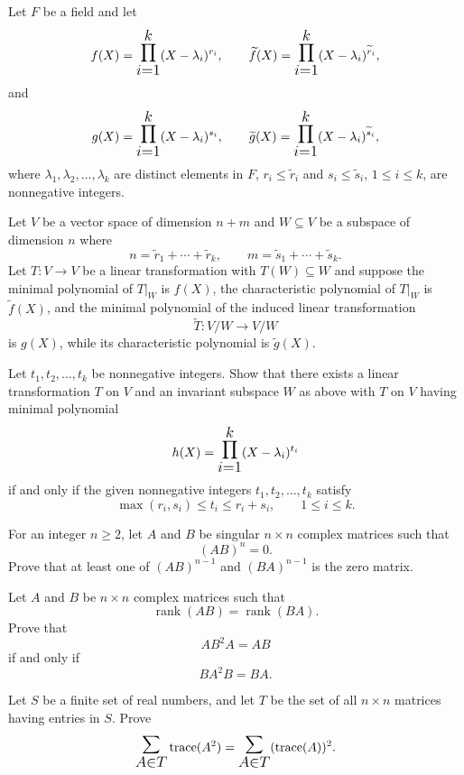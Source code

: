 \documentclass[12pt]{article}
\let\oldsum\sum
\let\oldprod\prod
\renewcommand{\sum}{\mathlarger{\mathlarger{\oldsum}}}
\renewcommand{\prod}{\mathlarger{\mathlarger{\oldprod}}}
\begin{document}
\begin{problem}
Let $F$ be a field and let
\[
f(X)=\prod_{i=1}^{k}(X-\lambda_i)^{r_i},\qquad
\widetilde f(X)=\prod_{i=1}^{k}(X-\lambda_i)^{\widetilde r_i},
\]
and
\[
g(X)=\prod_{i=1}^{k}(X-\lambda_i)^{s_i},\qquad
\widetilde g(X)=\prod_{i=1}^{k}(X-\lambda_i)^{\widetilde s_i},
\]
where $\lambda_1,\lambda_2,\ldots,\lambda_k$ are distinct elements in $F$,
$r_i\le \widetilde r_i$ and $s_i\le \widetilde s_i$, $1\le i\le k$,
are nonnegative integers.

Let $V$ be a vector space of dimension $n+m$ and $W\subseteq V$ be a subspace
of dimension $n$ where
\[
n=\widetilde r_1+\cdots+\widetilde r_k,\qquad
m=\widetilde s_1+\cdots+\widetilde s_k.
\]
Let $T:V\to V$ be a linear transformation with $T(W)\subseteq W$ and suppose the
minimal polynomial of $T|_W$ is $f(X)$, the characteristic polynomial of $T|_W$
is $\widetilde f(X)$, and the minimal polynomial of the induced linear transformation
\[
\widetilde T:V/W\longrightarrow V/W
\]
is $g(X)$, while its characteristic polynomial is $\widetilde g(X)$.

Let $t_1,t_2,\ldots,t_k$ be nonnegative integers. Show that there exists a linear
transformation $T$ on $V$ and an invariant subspace $W$ as above with $T$ on $V$
having minimal polynomial
\[
h(X)=\prod_{i=1}^{k}(X-\lambda_i)^{t_i}
\]
if and only if the given nonnegative integers $t_1,t_2,\ldots,t_k$ satisfy
\[
\max(r_i,s_i)\le t_i\le r_i+s_i,\qquad 1\le i\le k.
\]
\end{problem}

\begin{problem}
For an integer $n\ge2$, let $A$ and $B$ be singular $n\times n$ complex matrices such that
\[
(AB)^n=0.
\]
Prove that at least one of $(AB)^{n-1}$ and $(BA)^{n-1}$ is the zero matrix.
\end{problem}

\begin{problem}
Let $A$ and $B$ be $n\times n$ complex matrices such that
\[
\operatorname{rank}(AB)=\operatorname{rank}(BA).
\]
Prove that
\[
AB^2A=AB
\]
if and only if
\[
BA^2B=BA.
\]
\end{problem}

\begin{problem}
Let $S$ be a finite set of real numbers, and let $T$ be the set of all $n\times n$
matrices having entries in $S$. Prove
\[
\sum_{A\in T}\operatorname{trace}(A^2)
=
\sum_{A\in T}(\operatorname{trace}(A))^2.
\]
\end{problem}
\end{document}
